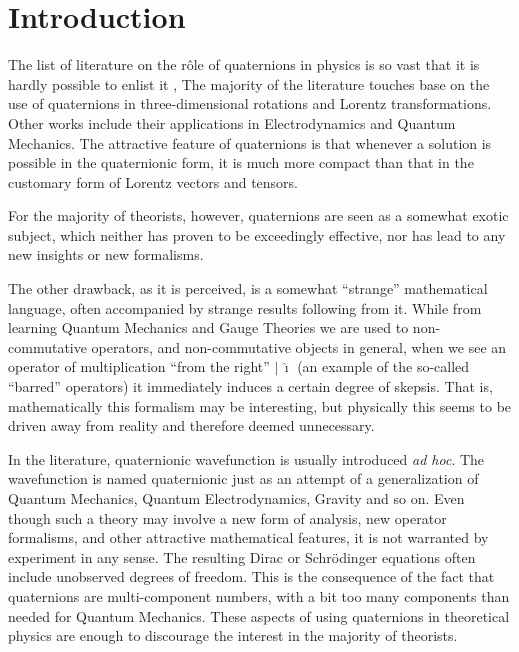 \documentclass[epsfig,12pt]{article}
\newcommand{\ii}{\hat\imath}
\begin{document}
\section{Introduction}
\setcounter{equation}{0}

	The list of literature on the r\^ole of quaternions in physics is so vast that it is hardly
	possible to enlist it \cite{Adler:1988hb}, 
	The majority of the literature touches base on the use of quaternions in three-dimensional
	rotations and Lorentz transformations.
	Other works include their applications in Electrodynamics and Quantum Mechanics.
	The attractive feature of quaternions is that whenever a solution is possible in the quaternionic form,
	it is much more compact than that in the customary form of Lorentz vectors and tensors. 

	For the majority of theorists, however, quaternions are seen as a somewhat exotic subject,
	which neither has proven to be exceedingly effective, nor has lead
	to any new insights or new formalisms.

	The other drawback, as it is perceived, is a somewhat ``strange'' mathematical language,
        often accompanied by strange results following from it.
	While from learning Quantum Mechanics and Gauge Theories we are used to non-commutative operators,
	and non-commutative objects in general, when we see an operator of multiplication ``from the right'' $ |\, \ii $
        (an example of the so-called ``barred'' operators) it immediately induces a certain degree of skepsis.
	That is, mathematically this formalism may be interesting, but physically this seems to be
	driven away from reality and therefore deemed unnecessary.

	In the literature, quaternionic wavefunction is usually introduced \emph{ad hoc}.
	The wavefunction is named quaternionic just as an attempt of a generalization of Quantum Mechanics,
	Quantum Electrodynamics, Gravity and so on.
	Even though such a theory may involve a new form of analysis, new operator formalisms,
	and other attractive mathematical features, it is not warranted by experiment in any sense. 
	The resulting Dirac or Schr\"odinger equations often include unobserved degrees of freedom.
	This is the consequence of the fact that quaternions are multi-component numbers,
        with a bit too many components than needed for Quantum Mechanics.
        These aspects of using quaternions in theoretical physics are enough to discourage the interest in the
        majority of theorists.
\end{document}
